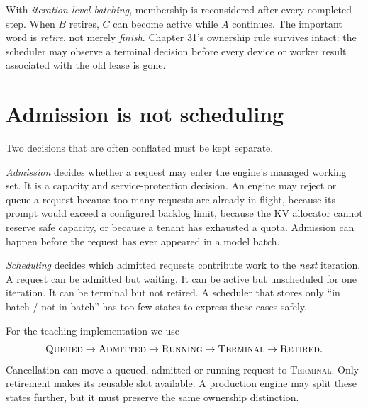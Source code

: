 With \emph{iteration-level batching}, membership is reconsidered after every
completed step. When $B$ retires, $C$ can become active while $A$ continues.
The important word is \emph{retire}, not merely \emph{finish}. Chapter 31's
ownership rule survives intact: the scheduler may observe a terminal decision
before every device or worker result associated with the old lease is gone.


\section{Admission is not scheduling}

Two decisions that are often conflated must be kept separate.

\emph{Admission} decides whether a request may enter the engine's managed
working set. It is a capacity and service-protection decision. An engine may
reject or queue a request because too many requests are already in flight,
because its prompt would exceed a configured backlog limit, because the KV
allocator cannot reserve safe capacity, or because a tenant has exhausted a
quota. Admission can happen before the request has ever appeared in a model
batch.

\emph{Scheduling} decides which admitted requests contribute work to the
\emph{next} iteration. A request can be admitted but waiting. It can be active
but unscheduled for one iteration. It can be terminal but not retired. A
scheduler that stores only ``in batch / not in batch'' has too few states to
express these cases safely.

For the teaching implementation we use
\[
 \textsc{Queued}\rightarrow\textsc{Admitted}\rightarrow
 \textsc{Running}\rightarrow\textsc{Terminal}\rightarrow\textsc{Retired}.
\]
Cancellation can move a queued, admitted or running request to
\textsc{Terminal}. Only retirement makes its reusable slot available. A
production engine may split these states further, but it must preserve the
same ownership distinction.


